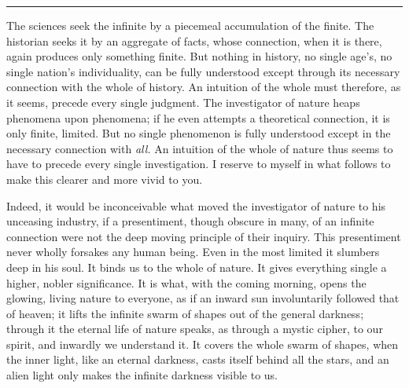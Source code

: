 \documentclass[12pt,a4paper,openany]{book}
\newcommand{\opage}[1]{\marginnote{\footnotesize\textit{[#1]}}}
\newcommand{\sectionrule}{\par\begin{center}\rule{4em}{0.4pt}\end{center}}
\begin{document}
\sectionrule

The sciences seek the infinite by a piecemeal accumulation of the finite. The
historian seeks it by an aggregate of facts, whose connection, when it is there,
again produces only something finite. But nothing in history, no single age's, no
single nation's individuality, can be fully understood except through its
necessary connection with the whole of history. An intuition of the whole must
therefore, as it seems, precede every single judgment. The investigator of nature
heaps phenomena upon phenomena; if he even attempts a theoretical connection, it is
only finite, limited. But no single phenomenon is fully understood except in the
necessary connection with \textit{all.} An intuition of the whole of nature thus
seems to have to precede every single investigation. I reserve to myself in what
follows to make this clearer and more vivid to you.

Indeed, it would be inconceivable what moved the investigator of nature to his
unceasing industry, if a presentiment, though obscure in many, of an infinite
connection were not the deep moving principle of their inquiry. This presentiment
never wholly forsakes any human being. Even in the most limited it slumbers deep in
his soul. It binds us to the whole of nature. It gives everything single a higher,
nobler significance. It is what, with the coming morning, opens the glowing, living
nature to everyone, as if an inward sun involuntarily followed that of heaven; it
lifts the infinite swarm of shapes out of the general darkness; through it the
eternal life of nature speaks, as through a mystic cipher, to our spirit, and
inwardly we understand it. It
\setcounter{footnote}{0}%
\opage{48}covers the whole swarm of shapes, when the inner light, like an eternal darkness,
casts itself behind all the stars, and an alien light only makes the infinite
darkness visible to us.
\end{document}
